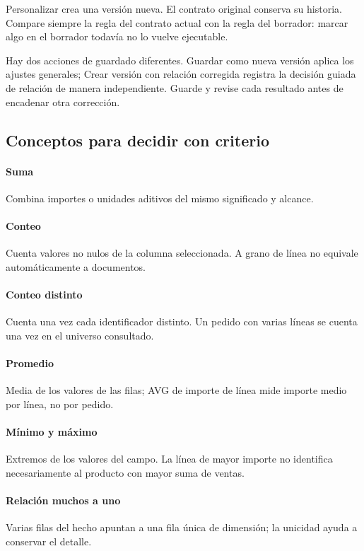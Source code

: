 Personalizar crea una versión nueva. El contrato original conserva su historia. Compare siempre la regla del contrato actual con la regla del borrador: marcar algo en el borrador todavía no lo vuelve ejecutable.

Hay dos acciones de guardado diferentes. Guardar como nueva versión aplica los ajustes generales; Crear versión con relación corregida registra la decisión guiada de relación de manera independiente. Guarde y revise cada resultado antes de encadenar otra corrección.

\subsection{Conceptos para decidir con criterio}
\paragraph{Suma} Combina importes o unidades aditivos del mismo significado y alcance.

\paragraph{Conteo} Cuenta valores no nulos de la columna seleccionada. A grano de línea no equivale automáticamente a documentos.

\paragraph{Conteo distinto} Cuenta una vez cada identificador distinto. Un pedido con varias líneas se cuenta una vez en el universo consultado.

\paragraph{Promedio} Media de los valores de las filas; AVG de importe de línea mide importe medio por línea, no por pedido.

\paragraph{Mínimo y máximo} Extremos de los valores del campo. La línea de mayor importe no identifica necesariamente al producto con mayor suma de ventas.

\paragraph{Relación muchos a uno} Varias filas del hecho apuntan a una fila única de dimensión; la unicidad ayuda a conservar el detalle.

